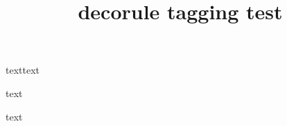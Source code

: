 \documentclass{article}
\title{decorule tagging test}
\begin{document}
text\decorule text

text

\decorule

text
\end{document}
